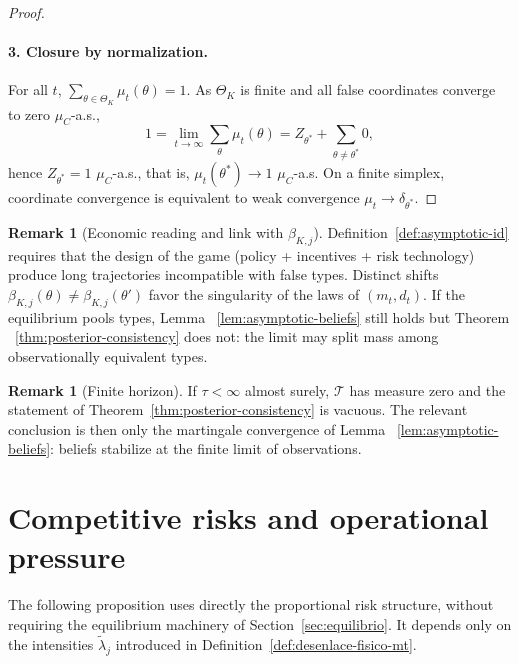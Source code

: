 \documentclass[ecta,nameyear,final,supplement]{econsocart}
\numberwithin{equation}{section}
\numberwithin{table}{section}
\theoremstyle{definition}
\newtheorem{remark}[theorem]{Remark}
\begin{document}
\begin{proof}
\paragraph{3. Closure by normalization.}
For all $t$, $\sum_{\theta\in\Theta_K}\mu_t(\theta)=1$. As $\Theta_K$ is
finite and all false coordinates converge to zero $\mu_C$-a.s.,
\[
1=\lim_{t\to\infty}\sum_\theta\mu_t(\theta)
=Z_{\theta^\ast}+\sum_{\theta\neq\theta^\ast}0,
\]
hence $Z_{\theta^\ast}=1$ $\mu_C$-a.s., that is,
$\mu_t(\theta^\ast)\to 1$ $\mu_C$-a.s. On a finite simplex, coordinate
convergence is equivalent to weak convergence $\mu_t\to\delta_{\theta^\ast}$.
\end{proof}

\begin{remark}[Economic reading and link with $\beta_{K,j}$]
\label{rem:lectura-beta}
Definition~\ref{def:asymptotic-id} requires that the design of the game
(policy + incentives + risk technology) produce long trajectories incompatible
with false types. Distinct shifts
$\beta_{K,j}(\theta)\neq\beta_{K,j}(\theta')$ favor the singularity of
the laws of $(m_t,d_t)$. If the equilibrium pools types, Lemma
~\ref{lem:asymptotic-beliefs} still holds but Theorem
~\ref{thm:posterior-consistency} does not: the limit may split mass among
observationally equivalent types.
\end{remark}

\begin{remark}[Finite horizon]
\label{rmk:horizonte-finito}
If $\tau<\infty$ almost surely, $\mathcal{T}$ has measure zero and the
statement of Theorem~\ref{thm:posterior-consistency} is vacuous. The relevant
conclusion is then only the martingale convergence of Lemma
~\ref{lem:asymptotic-beliefs}: beliefs stabilize at the finite limit of
observations.
\end{remark}

\section{Competitive risks and operational pressure}
\label{sec:riesgos}

\noindent The following proposition uses directly the proportional risk
structure, without requiring the equilibrium machinery of
Section~\ref{sec:equilibrio}. It depends only on the intensities
$\tilde\lambda_j$ introduced in Definition~\ref{def:desenlace-fisico-mt}.
\end{document}
